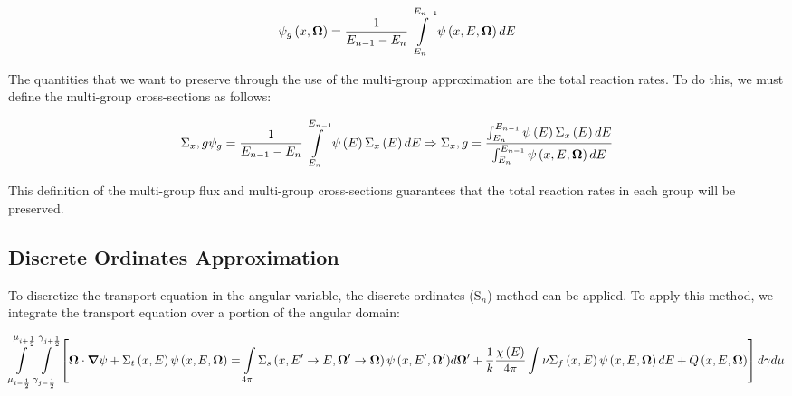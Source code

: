 \begin{equation}\label{e:multigroupangflux}
\psi_g\left(x,\bm \Omega\right)=\frac{1}{E_{n-1}-E_n} \intop_{E_n}^{E_{n-1}} \psi\left(x,E,\bm\Omega\right) dE
\end{equation}

The quantities that we want to preserve through the use of the multi-group approximation are the total reaction rates.  To do this, we must define the multi-group cross-sections as follows:

\begin{equation}\label{e:multigroupXS}
\Sigma_x,g \psi_g = \frac{1}{E_{n-1}-E_n} \intop_{E_n}^{E_{n-1}} \psi\left(E\right) \Sigma_x\left(E\right) dE \Rightarrow \Sigma_x,g = \frac{\intop_{E_n}^{E_{n-1}} \psi\left(E\right) \Sigma_x\left(E\right) dE}{\intop_{E_n}^{E_{n-1}} \psi\left(x,E,\bm\Omega\right) dE}
\end{equation}

This definition of the multi-group flux and multi-group cross-sections guarantees that the total reaction rates in each group will be preserved.


\subsection{Discrete Ordinates Approximation}

To discretize the transport equation in the angular variable, the discrete ordinates (S$_n$) method can be applied.  To apply this method, we integrate the transport equation over a portion of the angular domain:

\begin{dmath}
\intop_{\mu_{i-\frac{1}{2}}}^{\mu_{i+\frac{1}{2}}}\intop_{\gamma_{j-\frac{1}{2}}}^{\gamma_{j+\frac{1}{2}}} \left[ \bm \Omega \cdot \bm \nabla \psi + \Sigma_t\left(x,E\right)\psi\left(x,E,\bm \Omega\right) = \intop_{4\pi} \Sigma_s\left(x,E' \rightarrow E, \bm \Omega' \rightarrow \bm \Omega\right) {\psi\left(x,E',\bm \Omega'\right)} d\bm \Omega' + \frac{1}{k}\frac{\chi\left(E\right)}{4\pi} \intop \nu \Sigma_f\left(x,E\right) \psi\left(x,E,\bm \Omega\right) dE + Q\left(x,E,\bm \Omega\right) \right] d\gamma d\mu
\end{dmath}


